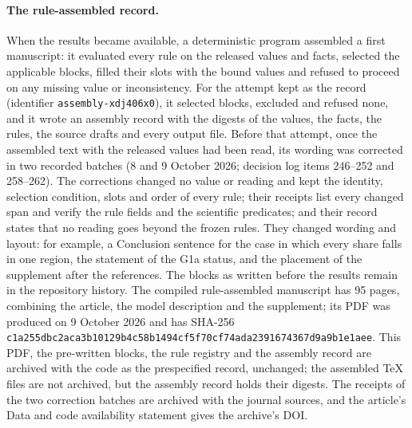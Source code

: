 \paragraph{The rule-assembled record.}
When the results became available, a deterministic program assembled a first manuscript: it evaluated every rule on the released values and facts, selected the applicable blocks, filled their slots with the bound values and refused to proceed on any missing value or inconsistency. For the attempt kept as the record (identifier \texttt{assembly-xdj406x0}), it selected  blocks, excluded  and refused none, and it wrote an assembly record with the digests of the values, the facts, the rules, the source drafts and every output file.
Before that attempt, once the assembled text with the released values had been read, its wording was corrected in two recorded batches (8 and 9 October 2026; decision log items 246--252 and 258--262). The corrections changed no value or reading and kept the identity, selection condition, slots and order of every rule; their receipts list every changed span and verify the rule fields and the scientific predicates; and their record states that no reading goes beyond the frozen rules. They changed wording and layout: for example, a Conclusion sentence for the case in which every share falls in one region, the statement of the G1a status, and the placement of the supplement after the references. The blocks as written before the results remain in the repository history.
The compiled rule-assembled manuscript has 95 pages, combining the article, the model description and the supplement; its PDF was produced on 9 October 2026 and has SHA-256 \texttt{c1a255dbc2aca3b1}\allowbreak\texttt{0129b4c58b1494cf}\allowbreak\texttt{5f70cf74ada23916}\allowbreak\texttt{74367d9a9b1e1aee}. This PDF, the pre-written blocks, the rule registry and the assembly record are archived with the code as the prespecified record, unchanged; the assembled TeX files are not archived, but the assembly record holds their digests. The receipts of the two correction batches are archived with the journal sources, and the article's Data and code availability statement gives the archive's DOI.

